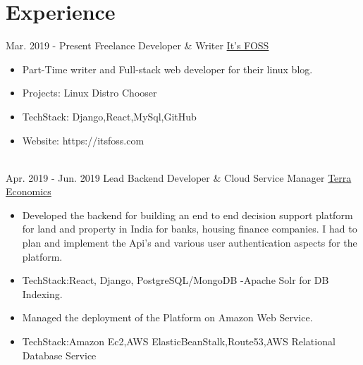 \documentclass[letterpaper]{twentysecondcv} %
\begin{document}
\makeprofile %
 

\section{Experience}

\begin{twenty} %
\twentyitem
    	{Mar. 2019 -}
		{Present}
        {Freelance Developer \& Writer}
        {\href{https://itsfoss.com}{It's FOSS}}
        {}
        {\begin{itemize}
        \item Part-Time writer and Full-stack web developer for their linux blog.
        \item Projects: Linux Distro Chooser
        
    \item TechStack: Django,React,MySql,GitHub
    
    \item Website: https://itsfoss.com
    
        
        \end{itemize}}
        \\
	\twentyitem
    	{Apr. 2019 -}
		{Jun. 2019}
        {Lead Backend Developer \& Cloud Service Manager}
        {\href{https://terra.tealindia.in}{Terra Economics}}
        {}
        {
        {\begin{itemize}
        \item  Developed the backend for building an end to end decision support platform for land and property in India for banks, housing finance companies. I had to plan and implement the Api's and various user authentication aspects for the platform.
        
        \item TechStack:React, Django, PostgreSQL/MongoDB -Apache Solr for DB Indexing.
        \newline
        
        \item Managed the deployment of the Platform on Amazon Web Service.
        
        \item TechStack:Amazon Ec2,AWS ElasticBeanStalk,Route53,AWS Relational Database Service
        

\end{itemize}}}
\end{twenty}
\end{document}
